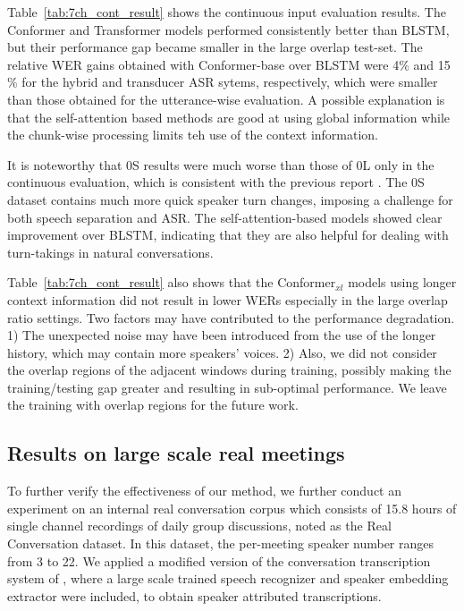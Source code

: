 \documentclass{article}
\begin{document}
	Table~\ref{tab:7ch_cont_result} shows the continuous input evaluation results. 
The Conformer and Transformer models performed consistently better than BLSTM, but their performance gap became smaller in the large overlap test-set. The relative WER gains obtained with 
	Conformer-base over BLSTM were 4$\%$ and 15$\%$ for the hybrid and transducer ASR sytems, respectively, which were smaller than those obtained for the utterance-wise evaluation. 
	A possible explanation is that the self-attention based methods are good at using global information while the chunk-wise processing limits teh use of the context information. 
	
	It is noteworthy that 0S results were much worse than those of 0L only in the continuous evaluation, which is consistent with the previous report \cite{chen2020continuous}.
	The 0S dataset contains much more quick speaker turn changes, imposing a challenge for both speech separation and ASR.  
	The self-attention-based models showed clear improvement over BLSTM, indicating that they are also helpful for dealing with turn-takings in natural conversations. 
	


	Table~\ref{tab:7ch_cont_result} also shows that 
	the Conformer$_{xl}$ models using 
	longer context information did not result in lower WERs especially in the large overlap ratio settings. 
	Two factors may have contributed to the performance degradation. 
	1) The unexpected noise may have been introduced from the use of the longer history, which may contain more speakers' voices. 2) Also, we did not consider the overlap regions of the adjacent windows during training, possibly making the training/testing gap greater and resulting in sub-optimal performance. We leave the training with overlap regions for the future work. 
	
	




	






	




	


	
	
	\subsection{Results on large scale real meetings}
	To further verify the effectiveness of our method, we further conduct an experiment on an internal real conversation corpus which consists of 15.8 hours of single channel recordings of daily group discussions, noted as the Real Conversation dataset. In this dataset, the per-meeting speaker number ranges from 3 to 22. We applied a modified version of the conversation transcription system of \cite{yoshioka2019advances}, where a large scale trained speech recognizer and speaker embedding extractor were included, 
to obtain  speaker attributed transcriptions.
\end{document}
